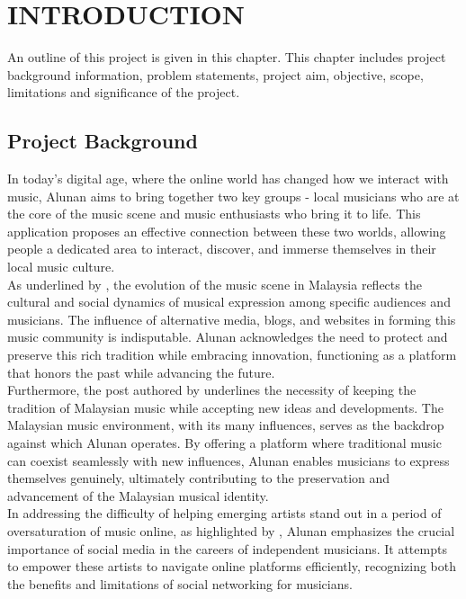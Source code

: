 \chapter{INTRODUCTION}
\label{ch:intro}
An outline of this project is given in this chapter. This chapter includes project background
information, problem statements, project aim, objective, scope, limitations and significance of
the project.
\section{Project Background}
In today's digital age, where the online world has changed how we interact with music, Alunan aims to bring together two key groups - local musicians who are at the core of the music scene and music enthusiasts who bring it to life. This application proposes an effective connection between these two worlds, allowing people a dedicated area to interact, discover, and immerse themselves in their local music culture. \\

As underlined by \textcite{ong19}, the evolution of the music scene in Malaysia reflects the cultural and social dynamics of musical expression among specific audiences and musicians. The influence of alternative media, blogs, and websites in forming this music community is indisputable. Alunan acknowledges the need to protect and preserve this rich tradition while embracing innovation, functioning as a platform that honors the past while advancing the future. \\

Furthermore, the post authored by \textcite{mohd21} underlines the necessity of keeping the tradition of Malaysian music while accepting new ideas and developments. The Malaysian music environment, with its many influences, serves as the backdrop against which Alunan operates. By offering a platform where traditional music can coexist seamlessly with new influences, Alunan enables musicians to express themselves genuinely, ultimately contributing to the preservation and advancement of the Malaysian musical identity. \\

In addressing the difficulty of helping emerging artists stand out in a period of oversaturation of music online, as highlighted by \textcite{haynes18}, Alunan emphasizes the crucial importance of social media in the careers of independent musicians. It attempts to empower these artists to navigate online platforms efficiently, recognizing both the benefits and limitations of social networking for musicians. \\

